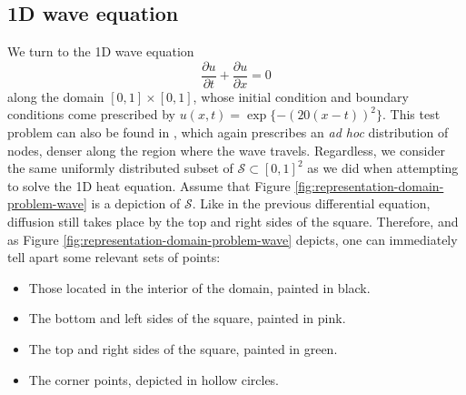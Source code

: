 \documentclass[12pt]{report} %
\begin{document}



\subsection{1D wave equation}

We turn to the 1D wave equation
\[ \frac{\partial u}{\partial t} + \frac{\partial u}{\partial x} = 0 \]
along the domain $[0, 1] \times [0, 1]$, whose initial condition and boundary
conditions come prescribed by $u (x, t) = \exp \{ - (20 (x - t))^2 \}$. This test problem can also be found in \cite{abrahamsen2019explicit}, which again prescribes an \textit{ad hoc} distribution of nodes, denser along the region where the wave travels. Regardless, we consider the same uniformly distributed subset of $\mathcal{S}\subset[0,1]^2$ as we did when attempting to solve the 1D heat equation. Assume that Figure \ref{fig:representation-domain-problem-wave} is a
depiction of $\mathcal{S}$. Like in the previous differential equation, diffusion still takes place by the
top and right sides of the square. Therefore, and as Figure \ref{fig:representation-domain-problem-wave} depicts, one can immediately tell apart some relevant sets of points:
\begin{itemize}
  \item Those located in the interior of the domain, painted in black.
  \item The bottom and left sides of the square, painted in pink.
  \item The top and right sides of the square, painted in green.
  \item The corner points, depicted in hollow circles. 
\end{itemize}
\end{document}

